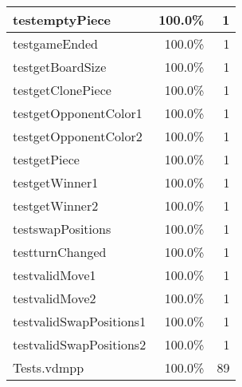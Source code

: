 \begin{longtable}{|l|r|r|}
\hline
testemptyPiece & 100.0\% & 1 \\
\hline
testgameEnded & 100.0\% & 1 \\
\hline
testgetBoardSize & 100.0\% & 1 \\
\hline
testgetClonePiece & 100.0\% & 1 \\
\hline
testgetOpponentColor1 & 100.0\% & 1 \\
\hline
testgetOpponentColor2 & 100.0\% & 1 \\
\hline
testgetPiece & 100.0\% & 1 \\
\hline
testgetWinner1 & 100.0\% & 1 \\
\hline
testgetWinner2 & 100.0\% & 1 \\
\hline
testswapPositions & 100.0\% & 1 \\
\hline
testturnChanged & 100.0\% & 1 \\
\hline
testvalidMove1 & 100.0\% & 1 \\
\hline
testvalidMove2 & 100.0\% & 1 \\
\hline
testvalidSwapPositions1 & 100.0\% & 1 \\
\hline
testvalidSwapPositions2 & 100.0\% & 1 \\
\hline
\hline
Tests.vdmpp & 100.0\% & 89 \\
\hline
\end{longtable}

